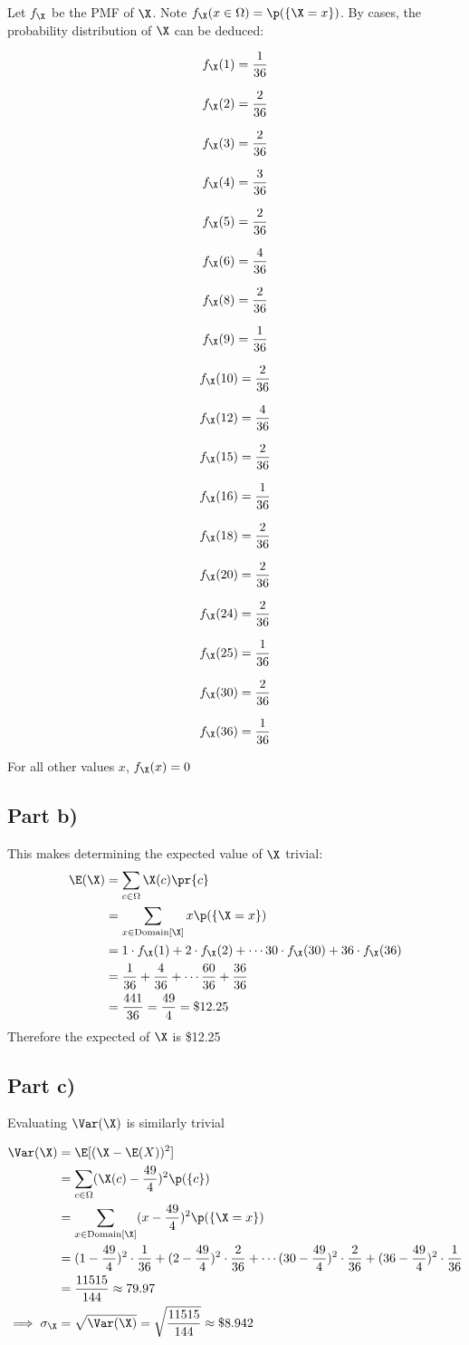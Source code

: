 Let $f_{\X}$ be the PMF of $\X$. Note $f_{\X}(x \in \Omega) = \p (\{ \X = x \})$. By cases, the probability distribution of $\X$ can be deduced:
\newcommand{\pq}[2]{
	\[f_{\X}(#1) = \frac{#2}{36}\]
}

\begin{multicols}{3}

\pq{1}{1}
\pq{2}{2}
\pq{3}{2}
\pq{4}{3}
\pq{5}{2}
\pq{6}{4}
\pq{8}{2}
\pq{9}{1}
\pq{10}{2}
\pq{12}{4}
\pq{15}{2}
\pq{16}{1}
\pq{18}{2}
\pq{20}{2}
\pq{24}{2}
\pq{25}{1}
\pq{30}{2}
\pq{36}{1}

\end{multicols}

For all other values $x$, $f_{\X}(x) = 0$

\subsection*{Part b)}

This makes determining the expected value of $\X$ trivial:
\begin{align*}
\E (\X) &= \sum _{c \in \Omega} \X (c) \pr{c} \\
&= \sum _{x \in \mathrm{Domain}[\X]} x \p (\{ \X = x\}) \\
&= 1 \cdot f_{\X} (1) + 2 \cdot f_{\X}(2) + \cdots 30 \cdot f_{\X}(30) + 36 \cdot f_{\X}(36) \\
&= \frac{1}{36} + \frac{4}{36} + \cdots \frac{60}{36} + \frac{36}{36} \\
&= \frac{441}{36} = \frac{49}{4} = \$12.25
\end{align*}
Therefore the expected of $\X$ is \$12.25

\subsection*{Part c)}

Evaluating $\Var(\X)$ is similarly trivial

\begin{align*}
\Var (\X) &= \E [(\X - \E (X))^2] \\
&= \sum _{c \in \Omega} (\X(c) - \frac{49}{4})^2 \p (\{ c \}) \\
&= \sum _{x \in \mathrm{Domain}[\X]} (x - \frac{49}{4})^2 \p (\{ \X = x \}) \\
&= (1 - \frac{49}{4})^2 \cdot \frac{1}{36} + (2 - \frac{49}{4})^2 \cdot \frac{2}{36} + \cdots
	(30 - \frac{49}{4})^2 \cdot \frac{2}{36} + (36 - \frac{49}{4})^2 \cdot \frac{1}{36} \\
&= \frac{11515}{144} \approx 79.97 \\
\implies \sigma _{\X} &= \sqrt{\Var(\X)} = \sqrt{\frac{11515}{144}} \approx \$8.942
\end{align*}

